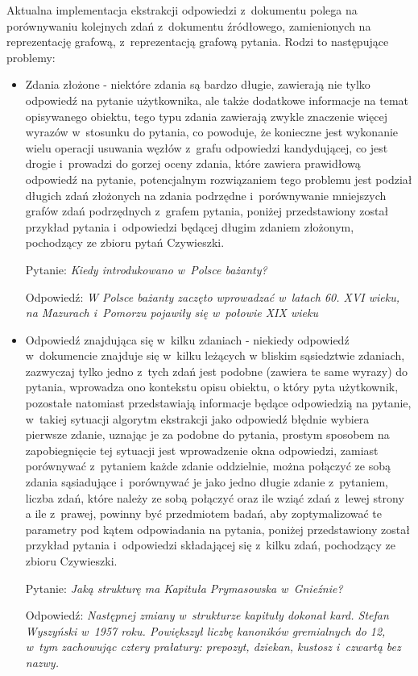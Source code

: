 \documentclass[a4paper, twoside, 12pt]{report}
\begin{document}
    Aktualna implementacja ekstrakcji odpowiedzi z~dokumentu polega na porównywaniu kolejnych zdań z~dokumentu źródłowego,
    zamienionych na reprezentację grafową, z~reprezentacją grafową pytania. Rodzi to następujące problemy:
    \begin{itemize}
        \item Zdania złożone - niektóre zdania są bardzo długie, zawierają nie tylko odpowiedź na pytanie użytkownika,
            ale także dodatkowe informacje na temat opisywanego obiektu, tego typu zdania zawierają zwykle znaczenie
            więcej wyrazów w~stosunku do pytania, co powoduje, że konieczne jest wykonanie wielu operacji usuwania węzłów
            z~grafu odpowiedzi kandydującej, co jest drogie i~prowadzi do gorzej oceny zdania, które zawiera prawidłową
            odpowiedź na pytanie, potencjalnym rozwiązaniem tego problemu jest podział długich zdań złożonych na zdania
            podrzędne i~porównywanie mniejszych grafów zdań podrzędnych z~grafem pytania, poniżej przedstawiony został
            przykład pytania i~odpowiedzi będącej długim zdaniem złożonym, pochodzący ze zbioru pytań Czywieszki.

            Pytanie: \emph{Kiedy introdukowano w~Polsce bażanty?}

            Odpowiedź: \emph{W Polsce bażanty zaczęto wprowadzać w~latach 60. XVI wieku, na Mazurach i~Pomorzu pojawiły się w~połowie XIX wieku}

        \item Odpowiedź znajdująca się w~kilku zdaniach - niekiedy odpowiedź w~dokumencie znajduje się w~kilku leżących w
            bliskim sąsiedztwie zdaniach, zazwyczaj tylko jedno z~tych zdań jest podobne (zawiera te same wyrazy) do pytania,
            wprowadza ono kontekstu opisu obiektu, o który pyta użytkownik, pozostałe natomiast przedstawiają informacje
            będące odpowiedzią na pytanie, w~takiej sytuacji algorytm ekstrakcji jako odpowiedź błędnie wybiera pierwsze
            zdanie, uznając je za podobne do pytania, prostym sposobem na zapobiegnięcie tej sytuacji jest wprowadzenie
            okna odpowiedzi, zamiast porównywać z~pytaniem każde zdanie oddzielnie, można połączyć ze sobą zdania sąsiadujące
            i~porównywać je jako jedno długie zdanie z~pytaniem, liczba zdań, które należy ze sobą połączyć oraz ile wziąć
            zdań z~lewej strony a ile z~prawej, powinny być przedmiotem badań, aby zoptymalizować te parametry pod kątem
            odpowiadania na pytania, poniżej przedstawiony został przykład pytania i~odpowiedzi składającej się z~kilku
            zdań, pochodzący ze zbioru Czywieszki.

            Pytanie: \emph{Jaką strukturę ma Kapituła Prymasowska w~Gnieźnie?}

            Odpowiedź: \emph{Następnej zmiany w~strukturze kapituły dokonał kard. Stefan Wyszyński w~1957 roku. Powiększył liczbę kanoników gremialnych do 12, w~tym zachowując cztery prałatury: prepozyt, dziekan, kustosz i~czwartą bez nazwy.}
    \end{itemize}
\end{document}
